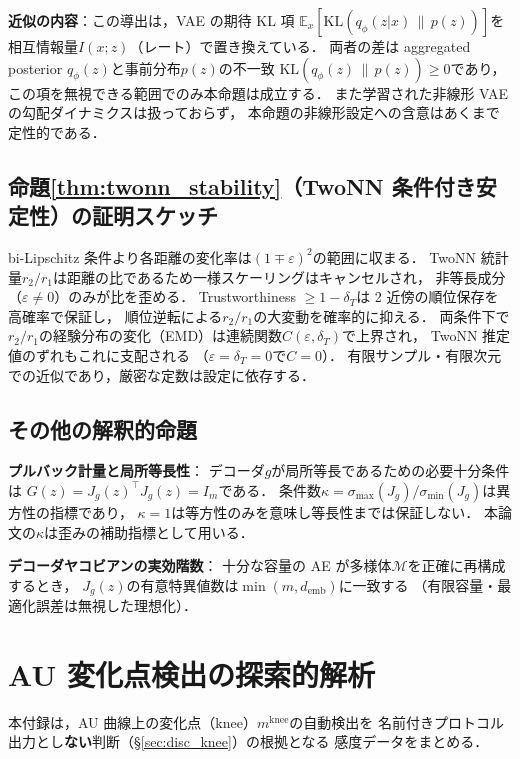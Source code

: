 \documentclass[11pt,a4paper]{jsarticle}
\newcommand{\Jg}{J_g}
\newcommand{\kap}{\kappa}
\newcommand{\demb}{d_{\mathrm{emb}}}
\newcommand{\mknee}{m^{\mathrm{knee}}}
\begin{document}
\textbf{近似の内容}：この導出は，VAE の期待 KL 項
$\mathbb{E}_x[\mathrm{KL}(q_\phi(z|x)\,\|\,p(z))]$を
相互情報量$I(x; z)$（レート）で置き換えている．
両者の差は aggregated posterior $q_\phi(z)$と事前分布$p(z)$の不一致
$\mathrm{KL}(q_\phi(z)\,\|\,p(z)) \geq 0$であり，
この項を無視できる範囲でのみ本命題は成立する．
また学習された非線形 VAE の勾配ダイナミクスは扱っておらず，
本命題の非線形設定への含意はあくまで定性的である．

\subsection{命題\ref{thm:twonn_stability}（TwoNN 条件付き安定性）の証明スケッチ}

bi-Lipschitz 条件より各距離の変化率は$(1 \mp \varepsilon)^2$の範囲に収まる．
TwoNN 統計量$r_2/r_1$は距離の比であるため一様スケーリングはキャンセルされ，
非等長成分（$\varepsilon \neq 0$）のみが比を歪める．
Trustworthiness $\geq 1 - \delta_T$は 2 近傍の順位保存を高確率で保証し，
順位逆転による$r_2/r_1$の大変動を確率的に抑える．
両条件下で$r_2/r_1$の経験分布の変化（EMD）は連続関数$C(\varepsilon, \delta_T)$で上界され，
TwoNN 推定値のずれもこれに支配される
（$\varepsilon = \delta_T = 0$で$C = 0$）．
有限サンプル・有限次元での近似であり，厳密な定数は設定に依存する．

\subsection{その他の解釈的命題}

\textbf{プルバック計量と局所等長性}：
デコーダ$g$が局所等長であるための必要十分条件は
$G(z) = \Jg(z)^\top \Jg(z) = I_m$である．
条件数$\kap = \sigma_{\max}(\Jg)/\sigma_{\min}(\Jg)$は異方性の指標であり，
$\kap = 1$は等方性のみを意味し等長性までは保証しない．
本論文の$\kap$は歪みの補助指標として用いる．

\textbf{デコーダヤコビアンの実効階数}：
十分な容量の AE が多様体$\mathcal{M}$を正確に再構成するとき，
$\Jg(z)$の有意特異値数は$\min(m, \demb)$に一致する
（有限容量・最適化誤差は無視した理想化）．

\section{AU 変化点検出の探索的解析}\label{app:knee}

本付録は，AU 曲線上の変化点（knee）$\mknee$の自動検出を
名前付きプロトコル出力とし\textbf{ない}判断（§\ref{sec:disc_knee}）の根拠となる
感度データをまとめる．
\end{document}
